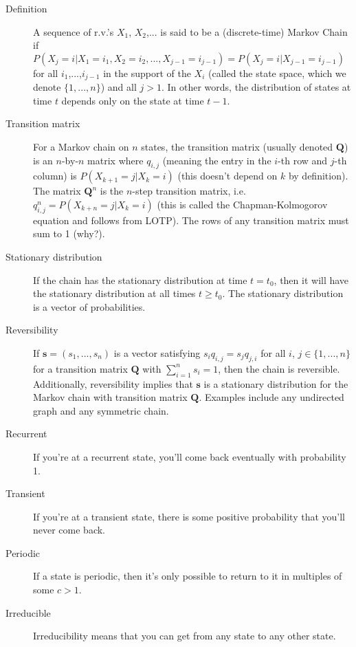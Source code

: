 \documentclass{article}
\begin{document}
\begin{description}

\item[Definition] A sequence of r.v.'s $X_1$, $X_2$,... is said to be a (discrete-time) Markov Chain if $P(X_j = i|X_1=i_1,X_2=i_2,...,X_{j-1}=i_{j-1}) = P(X_j=i|X_{j-1}=i_{j-1})$ for all $i_1$,...,$i_{j-1}$ in the support of the $X_i$ (called the state space, which we denote $\{1,...,n\}$) and all $j > 1$. In other words, the distribution of states at time $t$ depends only on the state at time $t-1$. 

\item[Transition matrix] For a Markov chain on $n$ states, the transition matrix (usually denoted $\mathbf{Q}$) is an $n$-by-$n$ matrix where $q_{i,j}$ (meaning the entry in the $i$-th row and $j$-th column) is $P(X_{k+1}=j|X_k=i)$ (this doesn't depend on $k$ by definition). The matrix $\mathbf{Q}^n$ is the $n$-step transition matrix, i.e. $q^n_{i,j} = P(X_{k+n}=j|X_k=i)$ (this is called the Chapman-Kolmogorov equation and follows from LOTP). The rows of any transition matrix must sum to 1 (why?).

\item[Stationary distribution] If the chain has the stationary distribution at time $t = t_0$, then it will have the stationary distribution at all times $t \geq t_0$. The stationary distribution is a vector of probabilities.

\item[Reversibility] If $\mathbf{s} = (s_1,...,s_n)$ is a vector satisfying $s_iq_{i,j} = s_jq_{j,i}$ for all $i$, $j \in \{1,...,n\}$ for a transition matrix $\mathbf{Q}$ with $\sum_{i=1}^n s_i = 1$, then the chain is reversible. Additionally, reversibility implies that $\mathbf{s}$ is a stationary distribution for the Markov chain with transition matrix $\mathbf{Q}$. Examples include any undirected graph and any symmetric chain. 

\item[Recurrent] If you're at a recurrent state, you'll come back eventually with probability 1.

\item[Transient] If you're at a transient state, there is some positive probability that you'll never come back.

\item[Periodic] If a state is periodic, then it's only possible to return to it in multiples of some $c > 1$.

\item[Irreducible] Irreducibility means that you can get from any state to any other state.

\end{description}
\end{document}
